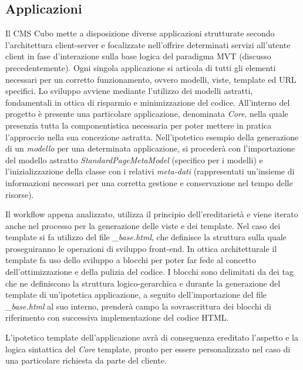 \subsection{Applicazioni}
Il CMS Cubo mette a disposizione diverse applicazioni strutturate secondo l'architettura client-server e focalizzate nell'offrire determinati servizi all'utente client in fase d'interazione sulla base logica del paradigma MVT (discusso precedentemente).\hfill \break
Ogni singola applicazione si articola di tutti gli elementi necessari per un corretto funzionamento, ovvero modelli, viste, template ed URL specifici. \hfill \break
Lo sviluppo avviene mediante l'utilizzo dei modelli astratti, fondamentali in ottica di risparmio e minimizzazione del codice.
All'interno del progetto è presente una particolare applicazione, denominata \textit{Core}, nella quale presenzia tutta la componentistica necessaria per poter mettere in pratica l'approccio nella sua concezione astratta.
Nell'ipotetico esempio della generazione di un \textit{modello} per una determinata applicazione, si procederà con l'importazione del modello astratto \textit{StandardPageMetaModel} (specifico per i modelli) e l'inizializzazione della classe con i relativi \textit{meta-dati} (rappresentati un'insieme di informazioni necessari per una corretta gestione e conservazione nel tempo delle risorse). \hfill \break

Il workflow appena analizzato, utilizza il principio dell'ereditarietà e viene iterato anche nel processo per la generazione delle viste e dei template.\hfill\break
Nel caso dei template si fa utilizzo del file \textit{\_base.html}, che definisce la struttura sulla quale proseguiranno le operazioni di sviluppo front-end. \hfill \break
In ottica architetturale il template fa uso dello sviluppo a blocchi per poter far fede al concetto dell'ottimizzazione e della pulizia del codice. \hfill \break
I blocchi sono delimitati da dei tag che ne definiscono la struttura logico-gerarchica e durante la generazione del template di un'ipotetica applicazione, a seguito dell'importazione del file  \textit{\_base.html} al suo interno, prenderà campo la sovrascrittura dei blocchi di riferimento con successiva implementazione del codice HTML. \hfill \break

\clearpage
L'ipotetico template dell'applicazione avrà di conseguenza ereditato l'aspetto e la logica sintattica del \textit{Core} template, pronto per essere personalizzato nel caso di una particolare richiesta da parte del cliente.


